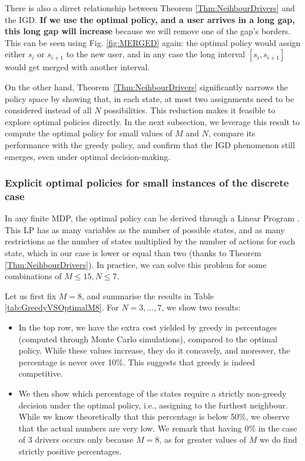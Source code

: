 \documentclass[12pt,english]{article}
\begin{document}
{There is also a direct relationship between Theorem \ref{Thm:NeihbourDrivers} and the IGD. \textbf{If we use the optimal policy, and a user arrives in a long gap, this long gap will increase} because we will remove one of the gap's borders. This can be seen using Fig. \ref{fig:MERGED} again: the optimal policy would assign either $s_i$ or $s_{i+1}$ to the new user, and in any case the long interval $[s_i,s_{i+1}]$ would get merged with another interval.

On the other hand, Theorem~\ref{Thm:NeihbourDrivers} significantly narrows the policy space by showing that, in each state, at most two assignments need to be considered instead of all $N$ possibilities. This reduction makes it feasible to explore optimal policies directly. In the next subsection, we leverage this result to compute the optimal policy for small values of $M$ and $N$, compare its performance with the greedy policy, and confirm that the IGD phenomenon still emerges, even under optimal decision-making.


\subsubsection{Explicit optimal policies for small instances of the discrete case}\label{sec:OptimalSmallInstances}


In any finite MDP, the optimal policy can be derived through a Linear Program \citep{puterman2014markov}. This LP has as many variables as the number of possible states, and as many restrictions as the number of states multiplied by the number of actions for each state, which in our case is lower or equal than two (thanks to Theorem \ref{Thm:NeihbourDrivers}). In practice, we can solve this problem for some combinations of $M \leq 15, N \leq 7$. 

Let us first fix $M=8$, and summarise the results in Table \ref{tab:GreedyVSOptimalM8}. For $N=3,\ldots,7$,  we show two results:
\begin{itemize}
    \item In the top row, we have the extra cost yielded by greedy in percentages (computed through Monte Carlo simulations), compared to the optimal policy. While these values increase, they do it concavely, and moreover, the percentage is never over 10\%. This suggests that greedy is indeed competitive. 
    \item We then show which percentage of the states require a strictly non-greedy decision under the optimal policy, i.e., assigning to the furthest neighbour. While we know theoretically that this percentage is below 50\%, we observe that the actual numbers are very low. We remark that having 0\% in the case of 3 drivers occurs only because $M=8$, as for greater values of $M$ we do find strictly positive percentages.
\end{itemize}


}
\end{document}
